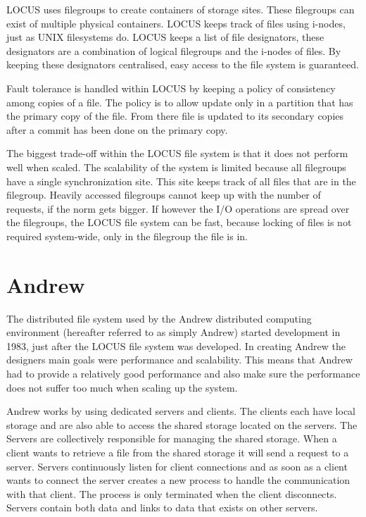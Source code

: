 \documentclass[a4paper,12px]{article}
\begin{document}
LOCUS uses filegroups to create containers of storage sites. These filegroups
can exist of multiple physical containers. LOCUS keeps track of files using
i-nodes, just as UNIX filesystems do. LOCUS keeps a list of file designators,
these designators are a combination of logical filegroups and the i-nodes of
files. \cite{concepts} By keeping these designators centralised, easy access to
the file system is guaranteed.

Fault tolerance is handled within LOCUS by keeping a policy of consistency among
copies of a file. The policy is to allow update only in a partition that has the
primary copy of the file. From there file is updated to its secondary copies
after a commit has been done on the primary copy.

The biggest trade-off within the LOCUS file system is that it does not perform
well when scaled. The scalability of the system is limited because all
filegroups have a single synchronization site. This site keeps track of all
files that are in the filegroup. Heavily accessed filegroups cannot keep up with
the number of requests, if the norm gets bigger. If however the I/O operations
are spread over the filegroups, the LOCUS file system can be fast, because
locking of files is not required system-wide, only in the filegroup the file is
in.

\section{Andrew}

The distributed file system used by the Andrew distributed computing environment
(hereafter referred to as simply Andrew) started development in 1983, just after
the LOCUS file system was developed. In creating Andrew the designers main goals
were performance and scalability. This means that Andrew had to provide a
relatively good performance and also make sure the performance does not suffer
too much when scaling up the system.\cite{andrew}

Andrew works by using dedicated servers and clients. The clients each have local
storage and are also able to access the shared storage located on the servers.
The Servers are collectively responsible for managing the shared
storage.\cite{concepts} When a client wants to retrieve a file from the shared
storage it will send a request to a server. Servers continuously listen for
client connections and as soon as a client wants to connect the server creates a
new process to handle the communication with that client. The process is only
terminated when the client disconnects.\cite{andrew} Servers contain both data
and links to data that exists on other servers.
\end{document}
